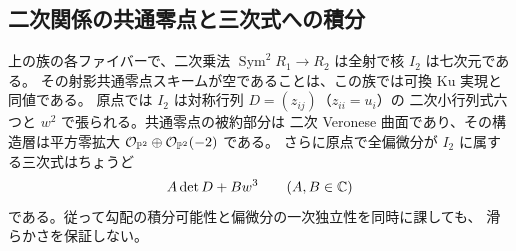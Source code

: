\subsection{二次関係の共通零点と三次式への積分}
\begin{proposition}\label{nft:prop:quadratic-base}
上の族の各ファイバーで、二次乗法
$\operatorname{Sym}^2 R_1\to R_2$ は全射で核 $I_2$ は七次元である。
その射影共通零点スキームが空であることは、この族では可換 Ku 実現と同値である。
原点では $I_2$ は対称行列 $D=(z_{ij})$（$z_{ii}=u_i$）の
二次小行列式六つと $w^2$ で張られる。共通零点の被約部分は
二次 Veronese 曲面であり、その構造層は平方零拡大
$\mathcal O_{\mathbb P^2}\oplus\mathcal O_{\mathbb P^2}(-2)$ である。
さらに原点で全偏微分が $I_2$ に属する三次式はちょうど
\[
                  A\det D+B w^3\qquad(A,B\in\mathbb C)
\]
である。従って勾配の積分可能性と偏微分の一次独立性を同時に課しても、
滑らかさを保証しない。
\end{proposition}
